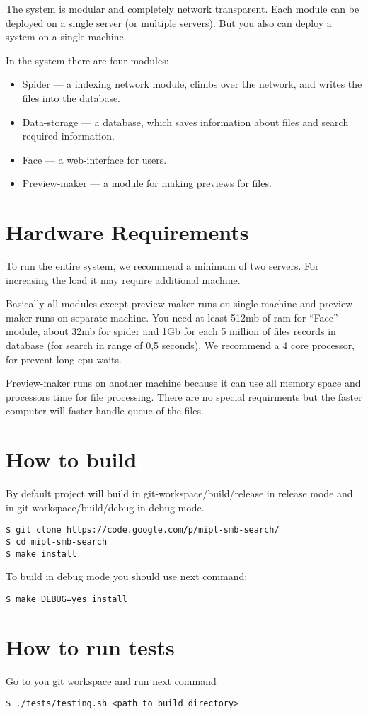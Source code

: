 \documentclass[11pt, oneside, a4paper]{book}
\begin{document}
The system is modular and completely network transparent. Each module can be deployed on a single server (or multiple servers). But you also can deploy a system on a single machine.

In the system there are four modules:

\begin{itemize}
  \item Spider --- a indexing network module, climbs over the network, and writes the files into the database.
  \item Data-storage --- a database, which saves information about files and search required information.
  \item Face --- a web-interface for users.
  \item Preview-maker --- a module for making previews for files.
\end{itemize}


\section{Hardware Requirements}
To run the entire system, we recommend a minimum of two servers. For increasing the load it may require additional machine.

Basically all modules except preview-maker runs on single machine and preview-maker runs on separate machine. You need at least 512mb of ram for ``Face'' module, about 32mb for spider and 1Gb for each 5 million of files records in database (for search in range of 0,5 seconds). We recommend a 4 core processor, for prevent long cpu waits.

Preview-maker runs on another machine because it can use all memory space and processors time for file processing. There are no special requirments but the faster computer will faster handle queue of the files.

\section{How to build}\label{sec:build}

By default project will build in git-workspace/build/release in release mode and in git-workspace/build/debug in debug mode.

\begin{lstlisting}
$ git clone https://code.google.com/p/mipt-smb-search/
$ cd mipt-smb-search
$ make install
\end{lstlisting}

To build in debug mode you should use next command:

\begin{lstlisting}
$ make DEBUG=yes install
\end{lstlisting}

\section{How to run tests}\label{sec:tests}

Go to you git workspace and run next command

\begin{lstlisting}
$ ./tests/testing.sh <path_to_build_directory>
\end{lstlisting}
\end{document}
